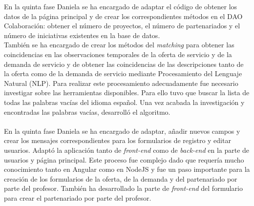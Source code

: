 \documentclass[11pt]{book}
\begin{document}
En la quinta fase Daniela se ha encargado de adaptar el código de obtener los datos de la página principal y de crear los correspondientes métodos en el DAO Colaboración: obtener el número de proyectos, el número de partenariados y el número de iniciativas existentes en la base de datos.\\ 
También se ha encargado de crear los métodos del \emph{matching} para obtener las coincidencias en las observaciones temporales de la oferta de servicio y de la demanda de servicio y de obtener las coincidencias de las descripciones tanto de la oferta como de la demanda de servicio mediante Procesamiento del Lenguaje Natural (NLP). Para realizar este procesamiento adecuadamente fue necesario investigar sobre las herramientas disponibles. Para ello tuvo que buscar la lista de todas las palabras vacías del idioma español. Una vez acabada la investigación y encontradas las palabras vacías, desarrolló el algoritmo.\\\\
En la quinta fase Daniela se ha encargado de adaptar, añadir nuevos campos y crear los mensajes correspondientes para los formularios de registro y editar usuarios. Adaptó la aplicación tanto de \textit{front-end} como de \textit{back-end} en la parte de usuarios y página principal. Este proceso fue complejo dado que requería mucho conocimiento tanto en Angular como en NodeJS y fue un paso importante para la creación de los formularios de la oferta, de la demanda y del partenariado por parte del profesor. También ha desarrollado la parte de \textit{front-end} del formulario para crear el partenariado por parte del profesor.
\end{document}
